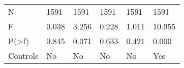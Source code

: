 \begin{tabular}{llllll}
N                                        &         1591 &         1591 &         1591 &         1591 &         1591 \\
F                                        &        0.038 &        3.256 &        0.228 &        1.011 &       10.955 \\
P(>f)                                    &        0.845 &        0.071 &        0.633 &        0.421 &        0.000 \\
Controls                                 &           No &           No &           No &           No &          Yes \\
\bottomrule
\end{tabular}
